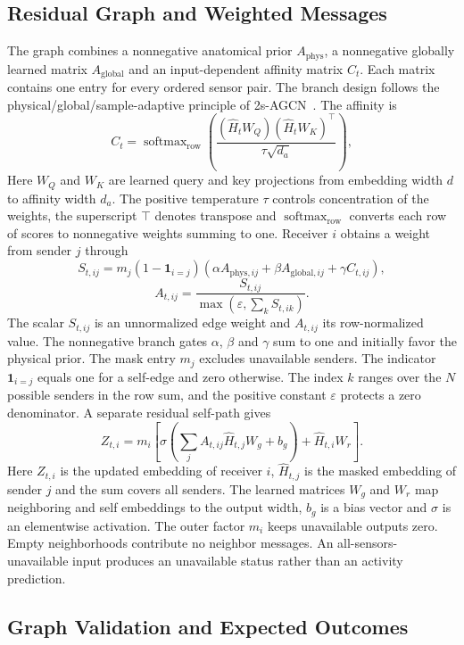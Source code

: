 \documentclass[10pt,a4paper,oneside,openany]{report}
\begin{document}
\subsection{Residual Graph and Weighted Messages}

The graph combines a nonnegative anatomical prior $A_{\mathrm{phys}}$, a nonnegative globally learned matrix $A_{\mathrm{global}}$ and an input-dependent affinity matrix $C_t$. Each matrix contains one entry for every ordered sensor pair. The branch design follows the physical/global/sample-adaptive principle of 2s-AGCN~\cite{agcn}. The affinity is
\[
C_t=\operatorname{softmax}_{\mathrm{row}}\!\left(
\frac{(\widehat H_tW_Q)(\widehat H_tW_K)^{\top}}{\tau\sqrt{d_a}}\right),
\]
Here $W_Q$ and $W_K$ are learned query and key projections from embedding width $d$ to affinity width $d_a$. The positive temperature $\tau$ controls concentration of the weights, the superscript $\top$ denotes transpose and $\operatorname{softmax}_{\mathrm{row}}$ converts each row of scores to nonnegative weights summing to one. Receiver $i$ obtains a weight from sender $j$ through
\[
S_{t,ij}=m_j(1-\mathbf{1}_{i=j})
\left(\alpha A_{\mathrm{phys},ij}+\beta A_{\mathrm{global},ij}+\gamma C_{t,ij}\right),
\]
\[
A_{t,ij}=\frac{S_{t,ij}}{\max\!\left(\varepsilon,\sum_kS_{t,ik}\right)}.
\]
The scalar $S_{t,ij}$ is an unnormalized edge weight and $A_{t,ij}$ its row-normalized value. The nonnegative branch gates $\alpha$, $\beta$ and $\gamma$ sum to one and initially favor the physical prior. The mask entry $m_j$ excludes unavailable senders. The indicator $\mathbf{1}_{i=j}$ equals one for a self-edge and zero otherwise. The index $k$ ranges over the $N$ possible senders in the row sum, and the positive constant $\varepsilon$ protects a zero denominator. A separate residual self-path gives
\[
Z_{t,i}=m_i\left[\sigma\!\left(\sum_j A_{t,ij}\widehat H_{t,j}W_g+b_g\right)
+\widehat H_{t,i}W_r\right].
\]
Here $Z_{t,i}$ is the updated embedding of receiver $i$, $\widehat H_{t,j}$ is the masked embedding of sender $j$ and the sum covers all senders. The learned matrices $W_g$ and $W_r$ map neighboring and self embeddings to the output width, $b_g$ is a bias vector and $\sigma$ is an elementwise activation. The outer factor $m_i$ keeps unavailable outputs zero. Empty neighborhoods contribute no neighbor messages. An all-sensors-unavailable input produces an unavailable status rather than an activity prediction.

\subsection{Graph Validation and Expected Outcomes}
\end{document}
